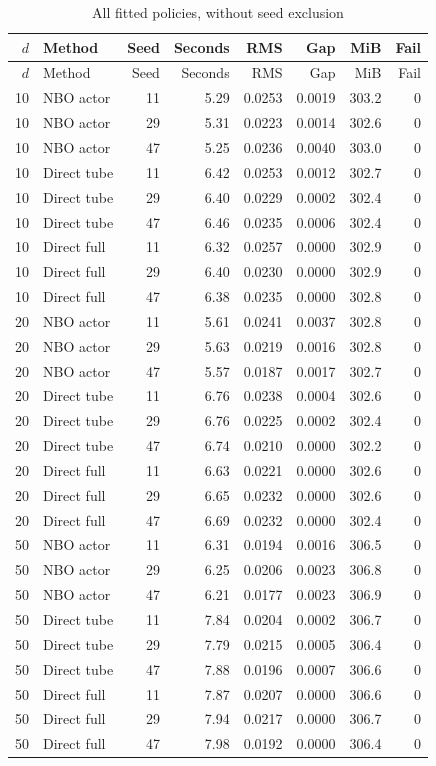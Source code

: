 \begin{longtable}{rlrrrrrr}
\caption{All fitted policies, without seed exclusion}\label{tab:r10allfits}\\
\toprule
$d$ & Method & Seed & Seconds & RMS & Gap & MiB & Fail\\
\midrule\endfirsthead
\toprule
$d$ & Method & Seed & Seconds & RMS & Gap & MiB & Fail\\
\midrule\endhead
10 & NBO actor & 11 & 5.29 & 0.0253 & 0.0019 & 303.2 & 0\\
10 & NBO actor & 29 & 5.31 & 0.0223 & 0.0014 & 302.6 & 0\\
10 & NBO actor & 47 & 5.25 & 0.0236 & 0.0040 & 303.0 & 0\\
10 & Direct tube & 11 & 6.42 & 0.0253 & 0.0012 & 302.7 & 0\\
10 & Direct tube & 29 & 6.40 & 0.0229 & 0.0002 & 302.4 & 0\\
10 & Direct tube & 47 & 6.46 & 0.0235 & 0.0006 & 302.4 & 0\\
10 & Direct full & 11 & 6.32 & 0.0257 & 0.0000 & 302.9 & 0\\
10 & Direct full & 29 & 6.40 & 0.0230 & 0.0000 & 302.9 & 0\\
10 & Direct full & 47 & 6.38 & 0.0235 & 0.0000 & 302.8 & 0\\
20 & NBO actor & 11 & 5.61 & 0.0241 & 0.0037 & 302.8 & 0\\
20 & NBO actor & 29 & 5.63 & 0.0219 & 0.0016 & 302.8 & 0\\
20 & NBO actor & 47 & 5.57 & 0.0187 & 0.0017 & 302.7 & 0\\
20 & Direct tube & 11 & 6.76 & 0.0238 & 0.0004 & 302.6 & 0\\
20 & Direct tube & 29 & 6.76 & 0.0225 & 0.0002 & 302.4 & 0\\
20 & Direct tube & 47 & 6.74 & 0.0210 & 0.0000 & 302.2 & 0\\
20 & Direct full & 11 & 6.63 & 0.0221 & 0.0000 & 302.6 & 0\\
20 & Direct full & 29 & 6.65 & 0.0232 & 0.0000 & 302.6 & 0\\
20 & Direct full & 47 & 6.69 & 0.0232 & 0.0000 & 302.4 & 0\\
50 & NBO actor & 11 & 6.31 & 0.0194 & 0.0016 & 306.5 & 0\\
50 & NBO actor & 29 & 6.25 & 0.0206 & 0.0023 & 306.8 & 0\\
50 & NBO actor & 47 & 6.21 & 0.0177 & 0.0023 & 306.9 & 0\\
50 & Direct tube & 11 & 7.84 & 0.0204 & 0.0002 & 306.7 & 0\\
50 & Direct tube & 29 & 7.79 & 0.0215 & 0.0005 & 306.4 & 0\\
50 & Direct tube & 47 & 7.88 & 0.0196 & 0.0007 & 306.6 & 0\\
50 & Direct full & 11 & 7.87 & 0.0207 & 0.0000 & 306.6 & 0\\
50 & Direct full & 29 & 7.94 & 0.0217 & 0.0000 & 306.7 & 0\\
50 & Direct full & 47 & 7.98 & 0.0192 & 0.0000 & 306.4 & 0\\
\bottomrule
\end{longtable}
